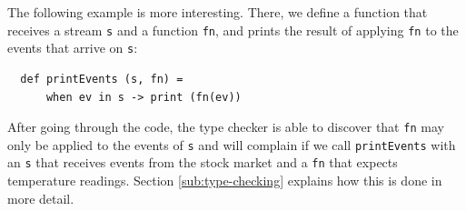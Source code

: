 The following example is more interesting. There, we define a function
that receives a stream \verb=s= and a function \verb=fn=, and prints
the result of applying \verb=fn= to the events that arrive on
\verb=s=:

\begin{lstlisting}
  def printEvents (s, fn) =
      when ev in s -> print (fn(ev))
\end{lstlisting}

After going through the code, the type checker is able to discover
that \verb=fn= may only be applied to the events of \verb=s= and will
complain if we call \verb=printEvents= with an \verb=s= that receives
events from the stock market and a \verb=fn= that expects temperature
readings. Section \ref{sub:type-checking} explains how this is done in
more detail.
